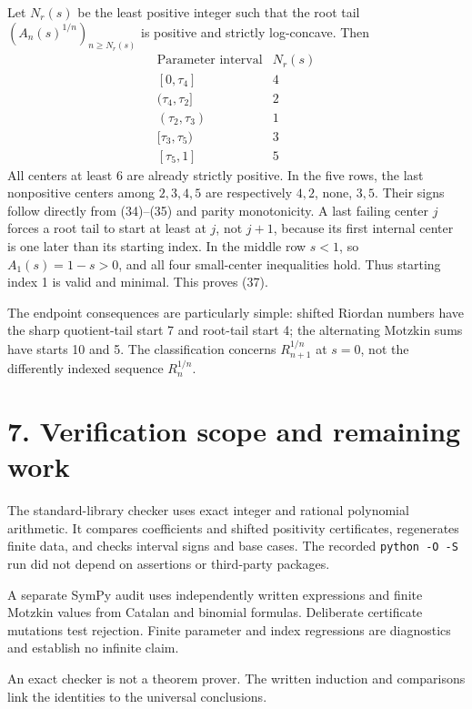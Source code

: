 \documentclass[
  11pt,
  a4paper,
]{article}
\begin{document}
Let \(N_r(s)\) be the least positive integer such that the root tail
\((A_n(s)^{1/n})_{n\ge N_r(s)}\) is positive and strictly log-concave.
Then \[
\begin{array}{c|c}
\text{Parameter interval}&N_r(s)\\\hline
{[0,\tau_4]}&4\\
(\tau_4,\tau_2]&2\\
(\tau_2,\tau_3)&1\\
{[\tau_3,\tau_5)}&3\\
{[\tau_5,1]}&5
\end{array}
\tag{37}
\] All centers at least 6 are already strictly positive. In the five
rows, the last nonpositive centers among \(2,3,4,5\) are respectively
\(4,2\), none, \(3,5\). Their signs follow directly from (34)--(35) and
parity monotonicity. A last failing center \(j\) forces a root tail to
start at least at \(j\), not \(j+1\), because its first internal center
is one later than its starting index. In the middle row \(s<1\), so
\(A_1(s)=1-s>0\), and all four small-center inequalities hold. Thus
starting index 1 is valid and minimal. This proves (37).

The endpoint consequences are particularly simple: shifted Riordan
numbers have the sharp quotient-tail start 7 and root-tail start 4; the
alternating Motzkin sums have starts 10 and 5. The classification
concerns \(R_{n+1}^{1/n}\) at \(s=0\), not the differently indexed
sequence \(R_n^{1/n}\).

\section{7. Verification scope and remaining
work}\label{verification-scope-and-remaining-work}

The standard-library checker uses exact integer and rational polynomial
arithmetic. It compares coefficients and shifted positivity
certificates, regenerates finite data, and checks interval signs and
base cases. The recorded \texttt{python\ -O\ -S} run did not depend on
assertions or third-party packages.

A separate SymPy audit uses independently written expressions and finite
Motzkin values from Catalan and binomial formulas. Deliberate
certificate mutations test rejection. Finite parameter and index
regressions are diagnostics and establish no infinite claim.

An exact checker is not a theorem prover. The written induction and
comparisons link the identities to the universal conclusions.
\end{document}
